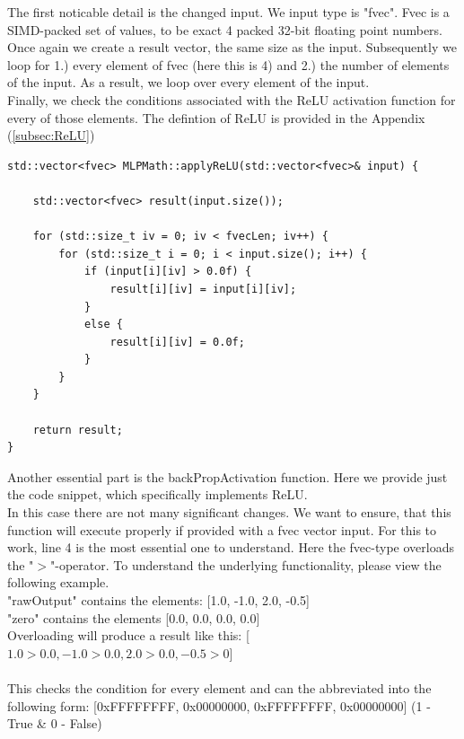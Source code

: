 \documentclass{article}
\begin{document}
\noindent The first noticable detail is the changed input. We input type is "fvec".
Fvec is a SIMD-packed set of values, to be exact 4 packed 32-bit floating point numbers.
Once again we create a result vector, the same size as the input. Subsequently we loop for 1.) every element of fvec (here this is 4) and 2.)
the number of elements of the input. As a result, we loop over every element of the input. \\

\noindent Finally, we check the conditions associated with the ReLU activation function for every of those elements.
The defintion of ReLU is provided in the Appendix (\hyperref[subsec:ReLU]{{\ref*{subsec:ReLU}}})


\begin{lstlisting}[caption=SIMD-ized ReLU]
    std::vector<fvec> MLPMath::applyReLU(std::vector<fvec>& input) {

    std::vector<fvec> result(input.size());

    for (std::size_t iv = 0; iv < fvecLen; iv++) {
        for (std::size_t i = 0; i < input.size(); i++) {
            if (input[i][iv] > 0.0f) {
                result[i][iv] = input[i][iv];
            }
            else {
                result[i][iv] = 0.0f;
            }
        }
    }
    
    return result;
}
\end{lstlisting}

\newpage
\noindent Another essential part is the backPropActivation function.
Here we provide just the code snippet, which specifically implements ReLU. \\

\noindent In this case there are not many significant changes.
We want to ensure, that this function will execute properly if provided with a fvec vector input.
For this to work, line 4 is the most essential one to understand. Here the fvec-type overloads the "$>$"-operator.
To understand the underlying functionality, please view the following example. \\

\noindent "rawOutput" contains the elements: [1.0, -1.0, 2.0, -0.5] \\
"zero" contains the elements [0.0, 0.0, 0.0, 0.0] \\

\noindent Overloading will produce a result like this:
[$1.0>0.0,-1.0>0.0,2.0>0.0,-0.5>0$] \\\\
\noindent This checks the condition for every element and can the abbreviated into the following form: [0xFFFFFFFF, 0x00000000, 0xFFFFFFFF, 0x00000000]
(1 - True \& 0 - False)
\end{document}
